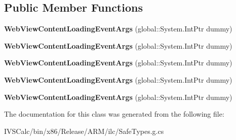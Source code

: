 \subsection*{Public Member Functions}
\begin{DoxyCompactItemize}
\item 
\mbox{\label{class_windows_1_1_u_i_1_1_xaml_1_1_controls_1_1_web_view_content_loading_event_args_a3d259930d04e2381b7bc4c25f5737e9d}} 
{\bfseries Web\+View\+Content\+Loading\+Event\+Args} (global\+::\+System.\+Int\+Ptr dummy)
\item 
\mbox{\label{class_windows_1_1_u_i_1_1_xaml_1_1_controls_1_1_web_view_content_loading_event_args_a3d259930d04e2381b7bc4c25f5737e9d}} 
{\bfseries Web\+View\+Content\+Loading\+Event\+Args} (global\+::\+System.\+Int\+Ptr dummy)
\item 
\mbox{\label{class_windows_1_1_u_i_1_1_xaml_1_1_controls_1_1_web_view_content_loading_event_args_a3d259930d04e2381b7bc4c25f5737e9d}} 
{\bfseries Web\+View\+Content\+Loading\+Event\+Args} (global\+::\+System.\+Int\+Ptr dummy)
\item 
\mbox{\label{class_windows_1_1_u_i_1_1_xaml_1_1_controls_1_1_web_view_content_loading_event_args_a3d259930d04e2381b7bc4c25f5737e9d}} 
{\bfseries Web\+View\+Content\+Loading\+Event\+Args} (global\+::\+System.\+Int\+Ptr dummy)
\item 
\mbox{\label{class_windows_1_1_u_i_1_1_xaml_1_1_controls_1_1_web_view_content_loading_event_args_a3d259930d04e2381b7bc4c25f5737e9d}} 
{\bfseries Web\+View\+Content\+Loading\+Event\+Args} (global\+::\+System.\+Int\+Ptr dummy)
\end{DoxyCompactItemize}


The documentation for this class was generated from the following file\+:\begin{DoxyCompactItemize}
\item 
I\+V\+S\+Calc/bin/x86/\+Release/\+A\+R\+M/ilc/Safe\+Types.\+g.\+cs\end{DoxyCompactItemize}
